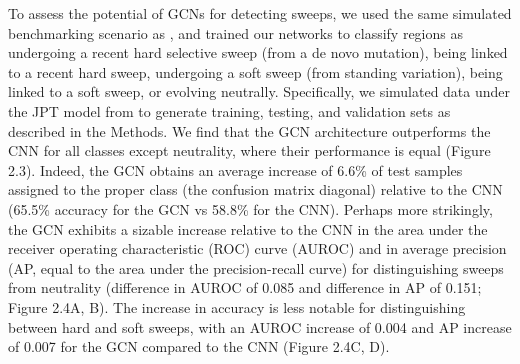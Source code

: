 To assess the potential of GCNs for detecting sweeps, we used the same simulated benchmarking scenario as \cite{flagelUnreasonableEffectivenessConvolutional2019}, and trained our networks to classify regions as undergoing a recent hard selective sweep (from a de novo mutation), being linked to a recent hard sweep, undergoing a soft sweep (from standing variation), being linked to a soft sweep, or evolving neutrally. Specifically, we simulated data under the JPT model from \cite{schriderSoftSweepsAre2017} to generate training, testing, and validation sets as described in the Methods. We find that the GCN architecture outperforms the CNN for all classes except neutrality, where their performance is equal (Figure 2.3). Indeed, the GCN obtains an average increase of 6.6\% of test samples assigned to the proper class (the confusion matrix diagonal) relative to the CNN (65.5\% accuracy for the GCN vs 58.8\% for the CNN). Perhaps more strikingly, the GCN exhibits a sizable increase relative to the CNN in the area under the receiver operating characteristic (ROC) curve (AUROC) and in average precision (AP, equal to the area under the precision-recall curve) for distinguishing sweeps from neutrality (difference in AUROC of 0.085 and difference in AP of 0.151; Figure 2.4A, B). The increase in accuracy is less notable for distinguishing between hard and soft sweeps, with an AUROC increase of 0.004 and AP increase of 0.007 for the GCN compared to the CNN (Figure 2.4C, D). 

